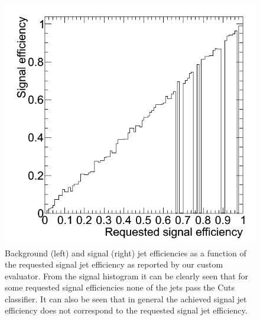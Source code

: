\begin{figure}[h]
\begin{center}
\begin{minipage}{.3\textwidth}
      \includegraphics[width=\textwidth]{images/mk_cuts-eval-effS}
    \end{minipage}
  \end{center}
  \caption{Background (left) and signal (right) jet efficiencies as a
    function of the requested signal jet efficiency as reported by our
    custom evaluator. From the signal histogram it can be clearly seen
    that for some requested signal efficiencies none of the jets pass
    the Cuts classifier. It can also be seen that in general the
    achieved signal jet efficiency does not correspond to the
    requested signal jet efficiency.}
  \label{fig:mkCutsEvalEff}
\end{figure}

\clearpage